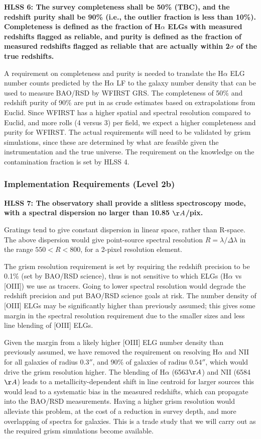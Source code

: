  \noindent
 {\bf HLSS 6: The survey completeness shall be 50\% (TBC), and the redshift purity
 shall be 90\% (i.e., the outlier fraction is less than 10\%). Completeness is
 defined as the fraction of H$\alpha$ ELGs with measured redshifts flagged as reliable,
 and purity is defined as the fraction of measured redshifts flagged as reliable
 that are actually within 2$\sigma$ of the true redshifts.}

 A requirement on completeness and purity is needed to translate the H$\alpha$ ELG
 number counts predicted by the H$\alpha$ LF to the galaxy number density that can be
 used to measure BAO/RSD by WFIRST GRS.  The completeness of 50\% and redshift
 purity of 90\% are put in as crude estimates based on extrapolations from
 Euclid.  Since WFIRST has a higher spatial and spectral resolution compared to
 Euclid, and more rolls (4 versus 3) per field, we expect a higher completeness
 and purity for WFIRST.  The actual requirements will need to be validated by
 grism simulations, since these are determined by what are feasible given the
 instrumentation and the true universe.  The requirement on the knowledge on the
 contamination fraction is set by HLSS 4.


 \subsubsection{Implementation Requirements (Level 2b)}

 \noindent
 {\bf HLSS 7: The observatory shall provide a slitless spectroscopy mode, with a
 spectral dispersion no larger than 10.85 $\AA$/pix.}

 Gratings tend to give constant dispersion in linear space, rather than R-space.
 The above dispersion would give point-source spectral resolution
 $R=\lambda/\Delta\lambda$ in the
 range $550 <R < 800$, for a 2-pixel resolution element.

 The grism resolution requirement is set by requiring the redshift precision to
 be 0.1\% (set by BAO/RSD science), thus is not sensitive to which ELGs (H$\alpha$
 vs [OIII]) we use as tracers. Going to lower spectral resolution would degrade
 the redshift precision and put BAO/RSD science goals at risk. The number density
 of [OIII] ELGs may be significantly higher than previously assumed; this gives
 some margin in the spectral resolution requirement due to the smaller sizes and
 less line blending of [OIII] ELGs.

 Given the margin from a likely higher [OIII] ELG number density than previously
 assumed, we have removed the requirement on resolving H$\alpha$ and NII for all
 galaxies of radius $0.3''$, and 90\% of galaxies of radius $0.54''$, which would drive
 the grism resolution higher. The blending of H$\alpha$ (6563$\AA$) and NII (6584$\AA$) leads to
 a metallicity-dependent shift in line centroid for larger sources
 this would lead to a systematic bias in the measured redshifts, which can
 propagate into the BAO/RSD measurements. Having a higher grism resolution would
 alleviate this problem, at the cost of a reduction in survey depth, and more
 overlapping of spectra for galaxies. This is a trade study that we will carry out
 as the required grism simulations become available.

